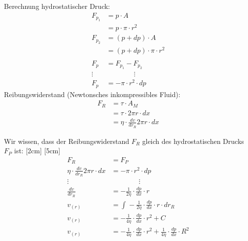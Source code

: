 \documentclass[a4paper,11pt,twoside]{article}
\begin{document}
Berechnung hydrostatischer Druck:
\begin{align*}
F_{p_1} &= p \cdot A \\
&= p \cdot \pi \cdot r^2 \\
F_{p_2} &= (p + dp) \cdot A \\ 
&= (p + dp) \cdot \pi \cdot r^2 \\ \\
F_p &= F_{p_1} - F_{p_2}\\
\vdots & \qquad \qquad \vdots \\
F_p &= -\pi \cdot r^2 \cdot dp
\end{align*}
Reibungswiderstand (Newtonsches inkompressibles Fluid):
\begin{align*}
F_R &= \tau \cdot A_M  \\
&= \tau \cdot 2\pi r \cdot dx \\
&= \eta \cdot \frac{dv}{dr_R} 2\pi r \cdot dx
\end{align*} 
\ppbig









Wir wissen, dass der Reibungswiderstand $F_R$ gleich des hydrostatischen Drucks $F_P$ ist:
[2cm]
\marginnote[$C = \frac{1}{4 \eta} \cdot \frac{dp}{dx} \cdot R^2$]{}[5cm]
\begin{align*}
F_R &= F_P \\
\eta \cdot \frac{dv}{dr_R} 2\pi r \cdot dx &= -\pi \cdot r^2 \cdot dp \\
\vdots & \qquad \qquad \vdots \\
\frac{dv}{dr_R}  &= -\frac{1}{2\eta} \cdot \frac{dp}{dx} \cdot r \\
v_{(r)} &= \int_{}{} - \frac{1}{2\eta} \cdot \frac{dp}{dx} \cdot r \cdot dr_R \\
v_{(r)} &= -\frac{1}{4 \eta} \cdot \frac{dp}{dx} \cdot r^2  +C \\
v_{(r)} &= -\frac{1}{4 \eta} \cdot \frac{dp}{dx} \cdot r^2  +\frac{1}{4 \eta} \cdot \frac{dp}{dx} \cdot R^2 
\end{align*}
\end{document}
